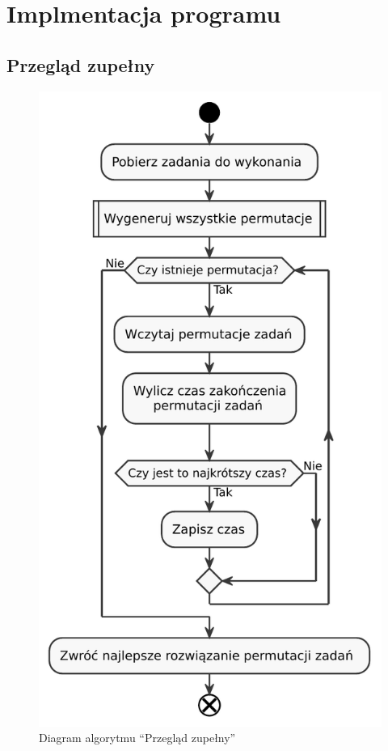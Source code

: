 \chapter{Implmentacja programu}

\section{Przegląd zupełny}

\begin{figure}[H]
    \centering
    \includegraphics[scale=0.7]{chapters/chapter4/brute_force.pdf}
    \caption{Diagram algorytmu ``Przegląd zupełny''}
    \label{brute_force}
\end{figure}

